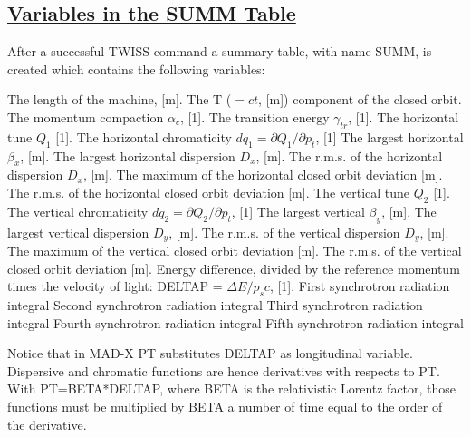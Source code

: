 \subsection{\href{summ}{Variables in the SUMM Table}} 
\label{subsec:tables_summ}
After a successful TWISS command a summary table, with name SUMM, is created which
contains the following variables:  
\begin{madlist}
   The length of the machine, [m].     
   The T ($= c t$, [m]) component of the closed orbit.     
   The momentum compaction $\alpha_c$, [1].     
   The transition energy $\gamma_{tr}$, [1].     
   The horizontal tune $Q_1$ [1].     
   The horizontal chromaticity $dq_1 = \partial Q_1 / \partial p_t$, [1]
   The largest horizontal $\beta_x$, [m].     
   The largest horizontal dispersion $D_x$, [m].     
   The r.m.s. of the horizontal dispersion $D_x$, [m].     
   The maximum of the horizontal closed orbit deviation [m].     
   The r.m.s. of the horizontal closed orbit deviation [m].     
   The vertical tune $Q_2$ [1].     
   The vertical chromaticity $dq_2 = \partial Q_2 / \partial p_t$, [1]
   The largest vertical $\beta_y$, [m].     
   The largest vertical dispersion $D_y$, [m].     
   The r.m.s. of the vertical dispersion $D_y$, [m].     
   The maximum of the vertical closed orbit deviation [m].     
   The r.m.s. of the vertical closed orbit deviation [m].     
   Energy difference, divided by the reference
  momentum times the velocity of light: DELTAP = $\Delta E / p_s c$, [1].
   First synchrotron radiation integral  
   Second synchrotron radiation integral  
   Third synchrotron radiation integral  
   Fourth synchrotron radiation integral  
   Fifth synchrotron radiation integral  
\end{madlist} 

Notice that in MAD-X PT substitutes DELTAP as longitudinal
variable. Dispersive and chromatic functions are hence derivatives with
respects to PT. With PT=BETA*DELTAP, where BETA is the relativistic
Lorentz factor, those functions must be multiplied by BETA a number of
time equal to the order of the derivative.  

